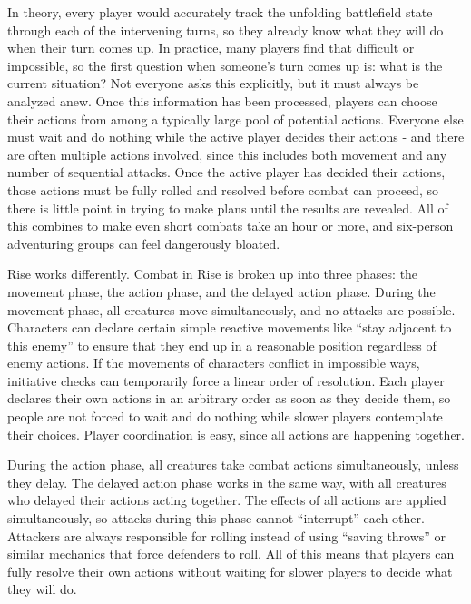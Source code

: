         In theory, every player would accurately track the unfolding battlefield state through each of the intervening turns, so they already know what they will do when their turn comes up.
        In practice, many players find that difficult or impossible, so the first question when someone's turn comes up is: what is the current situation?
        Not everyone asks this explicitly, but it must always be analyzed anew.
        Once this information has been processed, players can choose their actions from among a typically large pool of potential actions.
        Everyone else must wait and do nothing while the active player decides their actions - and there are often multiple actions involved, since this includes both movement and any number of sequential attacks.
        Once the active player has decided their actions, those actions must be fully rolled and resolved before combat can proceed, so there is little point in trying to make plans until the results are revealed.
        All of this combines to make even short combats take an hour or more, and six-person adventuring groups can feel dangerously bloated.

        Rise works differently.
        Combat in Rise is broken up into three phases: the movement phase, the action phase, and the delayed action phase.
        During the movement phase, all creatures move simultaneously, and no attacks are possible.
        Characters can declare certain simple reactive movements like ``stay adjacent to this enemy'' to ensure that they end up in a reasonable position regardless of enemy actions.
        If the movements of characters conflict in impossible ways, initiative checks can temporarily force a linear order of resolution.
        Each player declares their own actions in an arbitrary order as soon as they decide them, so people are not forced to wait and do nothing while slower players contemplate their choices.
        Player coordination is easy, since all actions are happening together.

        During the action phase, all creatures take combat actions simultaneously, unless they delay.
        The delayed action phase works in the same way, with all creatures who delayed their actions acting together.
        The effects of all actions are applied simultaneously, so attacks during this phase cannot ``interrupt'' each other.
        Attackers are always responsible for rolling instead of using ``saving throws'' or similar mechanics that force defenders to roll.
        All of this means that players can fully resolve their own actions without waiting for slower players to decide what they will do.

